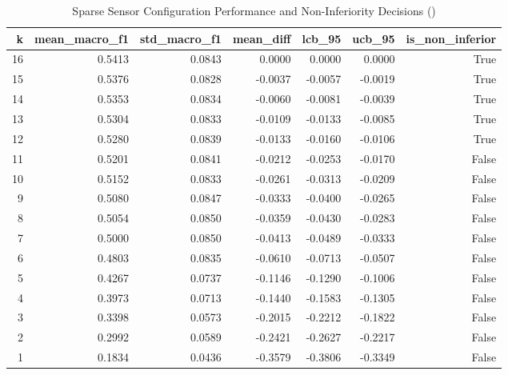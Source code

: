 \begin{table}
\caption{Sparse Sensor Configuration Performance and Non-Inferiority Decisions ()}
\label{tab:sparse_perf}
\begin{tabular}{rrrrrrr}
\toprule
k & mean_macro_f1 & std_macro_f1 & mean_diff & lcb_95 & ucb_95 & is_non_inferior \\
\midrule
16 & 0.5413 & 0.0843 & 0.0000 & 0.0000 & 0.0000 & True \\
15 & 0.5376 & 0.0828 & -0.0037 & -0.0057 & -0.0019 & True \\
14 & 0.5353 & 0.0834 & -0.0060 & -0.0081 & -0.0039 & True \\
13 & 0.5304 & 0.0833 & -0.0109 & -0.0133 & -0.0085 & True \\
12 & 0.5280 & 0.0839 & -0.0133 & -0.0160 & -0.0106 & True \\
11 & 0.5201 & 0.0841 & -0.0212 & -0.0253 & -0.0170 & False \\
10 & 0.5152 & 0.0833 & -0.0261 & -0.0313 & -0.0209 & False \\
9 & 0.5080 & 0.0847 & -0.0333 & -0.0400 & -0.0265 & False \\
8 & 0.5054 & 0.0850 & -0.0359 & -0.0430 & -0.0283 & False \\
7 & 0.5000 & 0.0850 & -0.0413 & -0.0489 & -0.0333 & False \\
6 & 0.4803 & 0.0835 & -0.0610 & -0.0713 & -0.0507 & False \\
5 & 0.4267 & 0.0737 & -0.1146 & -0.1290 & -0.1006 & False \\
4 & 0.3973 & 0.0713 & -0.1440 & -0.1583 & -0.1305 & False \\
3 & 0.3398 & 0.0573 & -0.2015 & -0.2212 & -0.1822 & False \\
2 & 0.2992 & 0.0589 & -0.2421 & -0.2627 & -0.2217 & False \\
1 & 0.1834 & 0.0436 & -0.3579 & -0.3806 & -0.3349 & False \\
\bottomrule
\end{tabular}
\end{table}
